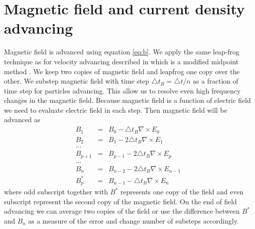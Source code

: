 \documentclass[oneside,branding,toc,article]{satdoc}
\begin{document}
\section{Magnetic field and current density advancing}
Magnetic field is advanced using equation \ref{eq:b}. We apply the same
leap-frog technique as for velocity advancing described in \cite{nr92} which is
a modified midpoint method \citep{nr92}.  We keep two copies of magnetic field
and leapfrog one copy over the other.  We substep magnetic field with time step
$\triangle t_B = \triangle t / n$ as a fraction of time step for particles
advancing.  This allow us to resolve even high frequency changes in the
magnetic field.  Because magnetic field is a function of electric field we need
to evaluate electric field in each step. Then magnetic field will be advanced
as
\begin{eqnarray}
  B_1 & = & B_0 - \triangle t_B \nabla \times E_0 \nonumber \\
  B_2 & = & B_1 - 2 \triangle t_B \nabla \times E_1 \nonumber \\
  ... \nonumber \\
  B_{p+1} & = & B_{p-1} - 2 \triangle t_B \nabla \times E_p \nonumber \\
  ... \nonumber \\
  B_{n} & = & B_{n-2} - 2 \triangle t_B \nabla \times E_{n-1} \nonumber \\
  B_{p}^* & = & B_{n-1} - \triangle t_B \nabla \times E_{n}
\end{eqnarray}
where odd subscript together with $B^*$ represents one copy of the field and
even subscript represent the second copy of the magnetic field.  On the end of
field advancing we can average two copies of the field or use the difference
between $B^*$ and $B_n$ as a measure of the error and change number of substeps
accordingly.
\end{document}
